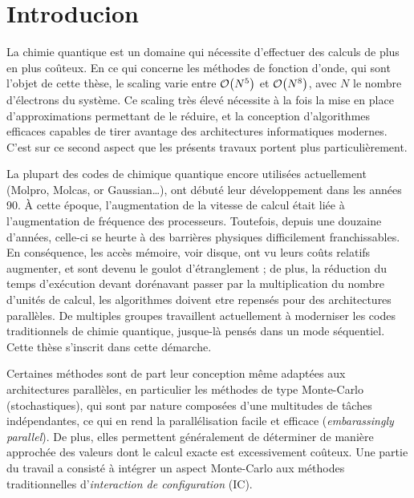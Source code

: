 \documentclass[./thesis.tex]{subfiles}
\begin{document}
\section{Introducion}

La chimie quantique est un domaine qui nécessite d'effectuer des calculs de plus en plus coûteux. En ce qui concerne les méthodes de fonction d'onde, qui sont l'objet de cette thèse, le scaling varie entre $\order{N^5}$ et $\order{N^8}$, avec $N$ le nombre d'électrons du système. Ce scaling très élevé nécessite à la fois la mise en place d'approximations permettant de le réduire, et la conception d'algorithmes efficaces capables de tirer avantage des architectures informatiques modernes. C'est sur ce second aspect que les présents travaux portent plus particulièrement.

La plupart des codes de chimique quantique encore utilisées actuellement (Molpro\cite{Molpro}, Molcas\cite{Molcas}, or Gaussian\cite{g09}\dots), ont débuté leur développement dans les années 90. À cette époque, l'augmentation de la vitesse de calcul était liée à l'augmentation de fréquence des processeurs. Toutefois, depuis une douzaine d'années, celle-ci se heurte à des barrières physiques difficilement franchissables. En conséquence, les accès mémoire, voir disque, ont vu leurs coûts relatifs augmenter,\cite{Wulf1995Mar} et sont devenu le goulot d'étranglement ; de plus, la réduction du temps d’exécution devant dorénavant passer par la multiplication du nombre d'unités de calcul, les algorithmes doivent etre repensés pour des architectures parallèles.\cite{Sutter_2005} De multiples groupes travaillent actuellement à moderniser les codes traditionnels de chimie quantique, jusque-là pensés dans un mode séquentiel. Cette thèse s'inscrit dans cette démarche. 

Certaines méthodes sont de part leur conception même adaptées aux architectures parallèles, en particulier les méthodes de type Monte-Carlo (stochastiques), qui sont par nature composées d'une multitudes de tâches indépendantes, ce qui en rend la parallélisation facile et efficace (\emph{embarassingly parallel}). De plus, elles permettent généralement de déterminer de manière approchée des valeurs dont le calcul exacte est excessivement coûteux. Une partie du travail a consisté à intégrer un aspect Monte-Carlo aux méthodes traditionnelles d'\emph{interaction de configuration} (IC).
\end{document}
